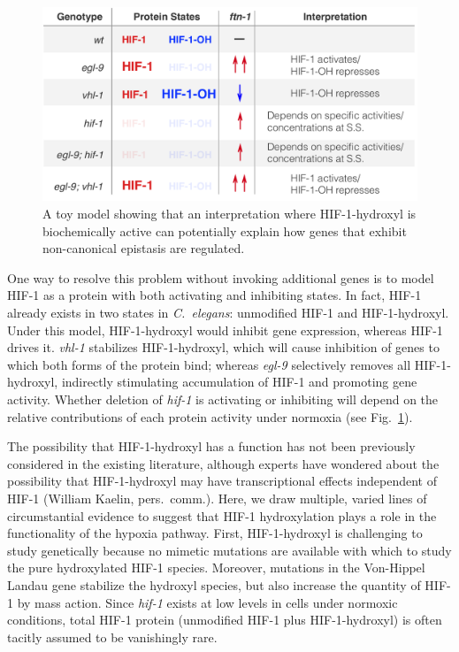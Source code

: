 \documentclass[9pt,twocolumn,twoside]{pnas-new}
\newcommand{\cel}{\emph{C.~elegans}}
\newcommand{\egl}{\emph{egl-9}}
\newcommand{\vhl}{\emph{vhl-1}}
\newcommand{\hif}{\emph{hif-1}}
\newcommand{\hifp}{HIF-1}
\begin{document}
\begin{figure}[tbhp]
\centering
\includegraphics[width=\linewidth]{figs/hif1oh_model.pdf}
\caption{
A toy model showing that an interpretation where \hifp{}-hydroxyl
is biochemically active can potentially explain how genes that exhibit
non-canonical epistasis are regulated.
}
\label{fig:hif1oh_table}
\end{figure}


One way to resolve this problem without invoking additional genes is to
model \hifp{} as a protein with both activating and inhibiting states. In fact,
\hifp{} already exists in two states in \cel{}: unmodified \hifp{} and
\hifp{}-hydroxyl. Under this model, \hifp{}-hydroxyl would inhibit gene expression,
whereas \hifp{} drives it. \vhl{} stabilizes \hifp{}-hydroxyl, which will
cause inhibition of genes to which both forms of the protein bind; whereas \egl{}
selectively removes all \hifp{}-hydroxyl, indirectly stimulating accumulation of
\hifp{} and promoting gene activity. Whether deletion of \hif{} is activating or
inhibiting will depend on the relative contributions of each protein activity
under normoxia (see Fig.~\ref{fig:hif1oh_table}).

The possibility that \hifp{}-hydroxyl has a function has not been previously
considered in the existing literature, although experts have wondered about
the possibility that \hifp{}-hydroxyl may have transcriptional effects independent
of \hifp{} (William Kaelin, pers.\ comm.). Here, we draw multiple, varied lines
of circumstantial evidence to suggest that \hifp{} hydroxylation plays a role
in the functionality of the hypoxia pathway. First, \hifp{}-hydroxyl is
challenging to study genetically because no mimetic mutations are available with
which to study the pure hydroxylated \hifp{} species. Moreover, mutations in
the Von-Hippel Landau gene stabilize the hydroxyl species, but also increase the
quantity of \hifp{} by mass action. Since \hif{} exists at low levels in cells
under normoxic conditions, total \hifp{} protein (unmodified \hifp{} plus
\hifp{}-hydroxyl) is often tacitly assumed to be vanishingly rare.
\end{document}
